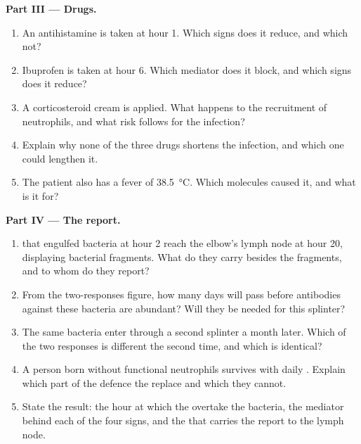 \begin{problem}
\medskip
\noindent\textbf{Part III --- Drugs.}
\begin{enumerate}[resume]
  \item An antihistamine is taken at hour 1. Which signs does it
        reduce, and which not?
  \item Ibuprofen is taken at hour 6. Which mediator does it block,
        and which signs does it reduce?
  \item A corticosteroid cream is applied. What happens to the
        recruitment of neutrophils, and what risk follows for the
        infection?
  \item Explain why none of the three drugs shortens the infection,
        and which one could lengthen it.
  \item The patient also has a fever of \qty{38.5}{\celsius}. Which
        molecules caused it, and what is it for?
\end{enumerate}

\medskip
\noindent\textbf{Part IV --- The report.}
\begin{enumerate}[resume]
  \item {} that engulfed bacteria at hour 2 reach the
        elbow's lymph node at hour 20, displaying bacterial fragments.
        What do they carry besides the fragments, and to whom do they
        report?
  \item From the two-responses figure, how many days will pass before
        antibodies against these bacteria are abundant? Will they be
        needed for this splinter?
  \item The same bacteria enter through a second splinter a month
        later. Which of the two responses is different the second
        time, and which is identical?
  \item A person born without functional neutrophils survives with
        daily . Explain which part of the defence the
         replace and which they cannot.
  \item State the result: the hour at which the  overtake
        the bacteria, the mediator behind each of the four signs, and
        the  that carries the report to the lymph node.
\end{enumerate}
\end{problem}
